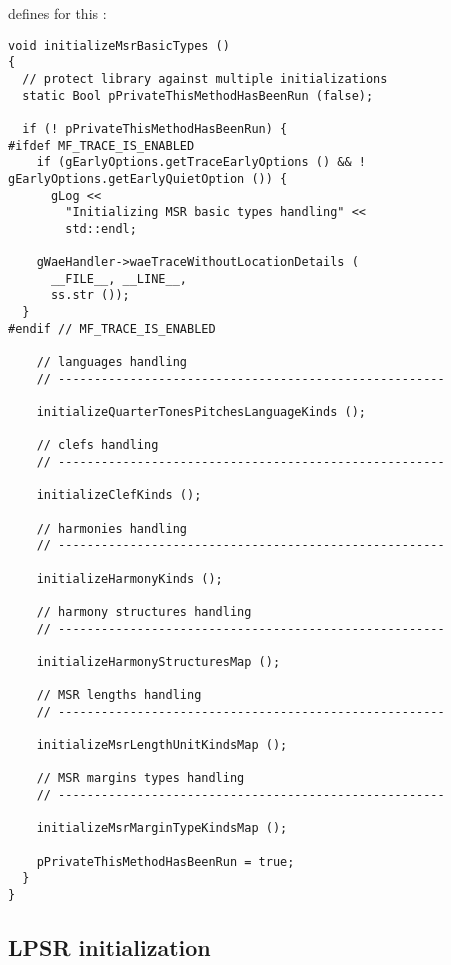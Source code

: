  defines  for this \initialization:
\begin{lstlisting}[language=CPlusPlus]
void initializeMsrBasicTypes ()
{
  // protect library against multiple initializations
  static Bool pPrivateThisMethodHasBeenRun (false);

  if (! pPrivateThisMethodHasBeenRun) {
#ifdef MF_TRACE_IS_ENABLED
    if (gEarlyOptions.getTraceEarlyOptions () && ! gEarlyOptions.getEarlyQuietOption ()) {
      gLog <<
        "Initializing MSR basic types handling" <<
        std::endl;

    gWaeHandler->waeTraceWithoutLocationDetails (
      __FILE__, __LINE__,
      ss.str ());
  }
#endif // MF_TRACE_IS_ENABLED

    // languages handling
    // ------------------------------------------------------

    initializeQuarterTonesPitchesLanguageKinds ();

    // clefs handling
    // ------------------------------------------------------

    initializeClefKinds ();

    // harmonies handling
    // ------------------------------------------------------

    initializeHarmonyKinds ();

    // harmony structures handling
    // ------------------------------------------------------

    initializeHarmonyStructuresMap ();

    // MSR lengths handling
    // ------------------------------------------------------

    initializeMsrLengthUnitKindsMap ();

    // MSR margins types handling
    // ------------------------------------------------------

    initializeMsrMarginTypeKindsMap ();

    pPrivateThisMethodHasBeenRun = true;
  }
}
\end{lstlisting}


\subsection{LPSR initialization}



